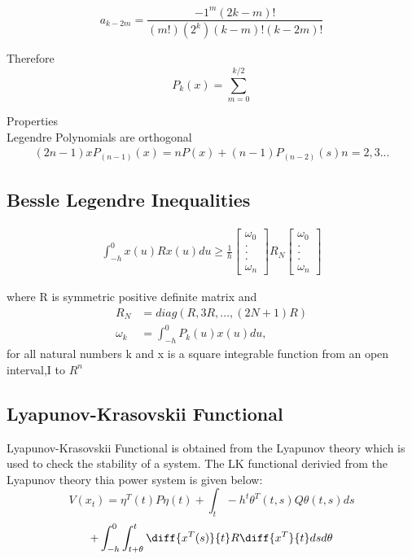 \documentclass[journal]{IEEEtran}
\begin{document}
    \begin{equation}
    a_{k-2m} = \frac{-1^m(2k-m)!}{(m!)(2^k)(k-m)!(k-2m)!}
  \end{equation}


  
    Therefore
    \begin{equation}
    P_k(x) = \sum_{m=0}^{k/2} 
  \end{equation}

   Properties \\
    Legendre Polynomials are orthogonal
    \begin{align}
    (2n-1)xP_(n-1)(x) = nP(x) + (n-1)P_(n-2)(s) n = 2, 3 ...
  \end{align}

    

\subsection{Bessle Legendre Inequalities}
 \begin{align}
   \int_{-h}^{0}x(u)Rx(u)du \geq \frac{1}{h}
   \begin{bmatrix}
     \omega_0 \\
     . \\
     . \\
     . \\
     \omega_n
   \end{bmatrix}
   R_N
   \begin{bmatrix}
  \omega_0 \\
  . \\
  . \\
  . \\
  \omega_n
\end{bmatrix}
 \end{align}

 where R is symmetric positive definite matrix
 and 
 \begin{align}
   R_N &= diag(R,3R,...,(2N+1)R) \\
   \omega_k&= \int_{-h}^{0}P_k(u)x(u)du, 
 \end{align}
 for all natural numbers k and x is a square integrable function
 from an open interval,I to $R^n$
\subsection{Lyapunov-Krasovskii Functional}
Lyapunov-Krasovskii Functional is obtained from the Lyapunov theory which is used to check the stability of a system. The LK functional derivied from the Lyapunov theory thia power system is given below:
\begin{equation*}
V(x_t) = \eta ^T (t)P \eta(t) + \int _t-h^t \theta ^T(t,s)Q\theta(t,s)ds 
\end{equation*}
\begin{equation*}
 +\int _{-h} ^0 \int _{t+\theta}^t\diff{x^T(s)}{t}R\diff{x^T}{t}dsd\theta
\end{equation*}
\end{document}
